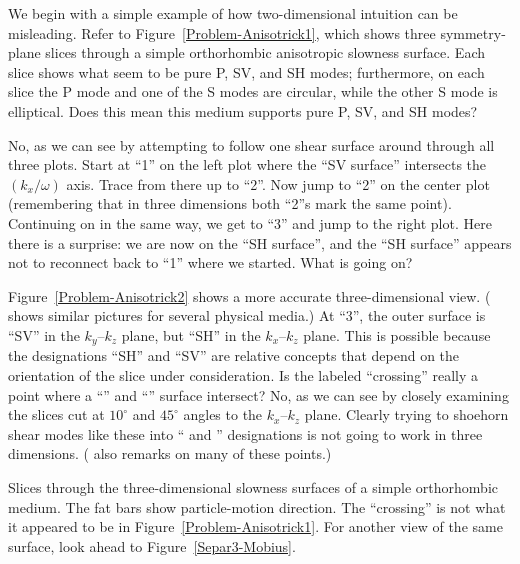 We begin with a simple example of how two-dimensional intuition can
be misleading.
Refer to Figure~\ref{Problem-Anisotrick1},
which shows three symmetry-plane slices through a simple
orthorhombic anisotropic slowness surface.
Each slice shows what seem to be pure
P, SV, and SH modes; furthermore, on each slice the P mode and one
of the S modes are circular, while the other S mode is
elliptical. Does this mean this medium supports pure P,
SV, and SH modes?


No, as we can see by attempting to follow one shear surface around
through all three plots. Start at ``1'' on the left plot where
the ``SV surface'' intersects the $(k_x / \omega)$ axis. Trace from
there up to ``2''. Now jump to ``2'' on the center plot (remembering
that in three dimensions both ``2''s mark the same point).
Continuing on in the same way, we get to ``3'' and jump to the right plot.
Here there is a surprise:
we are now on the ``SH surface'', and the ``SH surface'' appears not
to reconnect back to ``1'' where we started.
What is going on?

Figure~\ref{Problem-Anisotrick2} shows a more accurate three-dimensional view.
(\cite{musgrave1981elastodynamic}
shows similar pictures for several physical media.)
At ``3'', the outer surface
is ``SV'' in the $k_y$--$k_z$ plane, but ``SH'' in the $k_x$--$k_z$
plane.
This is possible because the designations
``SH'' and ``SV'' are relative concepts that
depend on the orientation of the slice under consideration.
Is the labeled ``crossing'' really a point where a ``{\qSH}'' and
``{\qSV}'' surface intersect? No, as we can see by
closely examining the slices cut
at $10^\circ$ and $45^\circ$ angles to the $k_x$--$k_z$ plane.
Clearly trying to shoehorn shear modes like these into ``{\qSV} and {\qSH}''
designations is not going to work in three dimensions.
(\cite{crampin1981review} also remarks on many of these points.)

{
Slices through the three-dimensional slowness surfaces
of a simple orthorhombic medium.
The fat bars show particle-motion direction.
The ``crossing'' is not what it appeared to be in
Figure~\protect\ref{Problem-Anisotrick1}.
For another view of the same surface,
look ahead to Figure~\protect\ref{Separ3-Mobius}.
}

